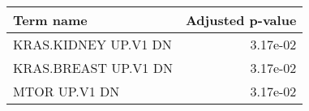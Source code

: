 \begin{tabular}{lr}
\toprule
           Term name &  Adjusted p-value \\
\midrule
KRAS.KIDNEY UP.V1 DN &          3.17e-02 \\
KRAS.BREAST UP.V1 DN &          3.17e-02 \\
       MTOR UP.V1 DN &          3.17e-02 \\
\bottomrule
\end{tabular}
